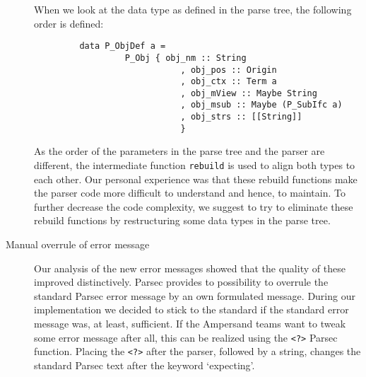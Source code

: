 \begin{description}
   When we look at the data type as defined in the parse tree, the following order is defined:
   \begin{verbatim}
         data P_ObjDef a =
                  P_Obj { obj_nm :: String          
                             , obj_pos :: Origin  
                             , obj_ctx :: Term a
                             , obj_mView :: Maybe String 
                             , obj_msub :: Maybe (P_SubIfc a)  
                             , obj_strs :: [[String]]
                             } 
    \end{verbatim}

    As the order of the parameters in the parse tree and the parser are different, the intermediate function \texttt{rebuild} is used to align both types to each other.
   Our personal experience was that these rebuild functions make the parser code more difficult to understand and hence, to maintain.
   To further decrease the code complexity, we suggest to try to eliminate these rebuild functions by restructuring some data types in the parse tree.

  \item[Manual overrule of error message]
    Our analysis of the new error messages showed that the quality of these improved distinctively.
    Parsec provides to possibility to overrule the standard Parsec error message by an own formulated message.
    During our implementation we decided to stick to the standard if the standard error message was, at least, sufficient.
    If the Ampersand teams want to tweak some error message after all, this can be realized using the \texttt{<?>} Parsec function.
    Placing the \texttt{<?>} after the parser, followed by a string, changes the standard Parsec text after the keyword `expecting'.

\end{description}
